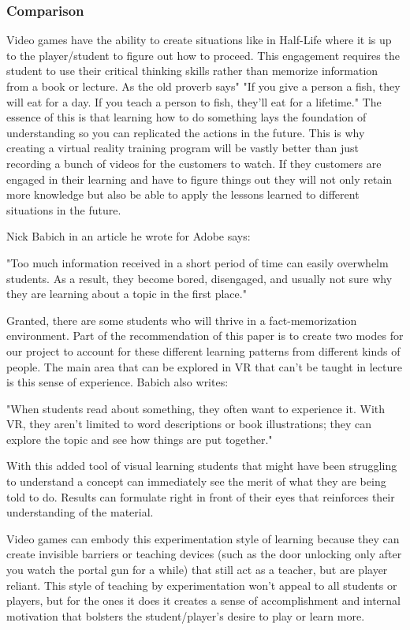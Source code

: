 \documentclass[onecolumn, draftclsnofoot,10pt, compsoc]{IEEEtran}
\begin{document}
\subsubsection{Comparison}
Video games have the ability to create situations like in Half-Life where it is up to the player/student to figure out how to proceed. This engagement requires the student to use their critical thinking skills rather than memorize information from a book or lecture. As the old proverb says" "If you give a person a fish, they will eat for a day. If you teach a person to fish, they'll eat for a lifetime." The essence of this is that learning how to do something lays the foundation of understanding so you can replicated the actions in the future. This is why creating a virtual reality training program will be vastly better than just recording a bunch of videos for the customers to watch. If they customers are engaged in their learning and have to figure things out they will not only retain more knowledge but also be able to apply the lessons learned to different situations in the future.

Nick Babich in an article he wrote for Adobe says:
\begin{displayquote}
"Too much information received in a short period of time can easily overwhelm students. As a result, they become bored, disengaged, and usually not sure why they are learning about a topic in the first place." \cite{adobe}
\end{displayquote}
Granted, there are some students who will thrive in a fact-memorization environment. Part of the recommendation of this paper is to create two modes for our project to account for these different learning patterns from different kinds of people. The main area that can be explored in VR that can't be taught in lecture is this sense of experience. Babich also writes:
\begin{displayquote}
"When students read about something, they often want to experience it. With VR, they aren't limited to word descriptions or book illustrations; they can explore the topic and see how things are put together." \cite{adobe}
\end{displayquote}
With this added tool of visual learning students that might have been struggling to understand a concept can immediately see the merit of what they are being told to do. Results can formulate right in front of their eyes that reinforces their understanding of the material.

Video games can embody this experimentation style of learning because they can create invisible barriers or teaching devices (such as the door unlocking only after you watch the portal gun for a while) that still act as a teacher, but are player reliant. This style of teaching by experimentation won't appeal to all students or players, but for the ones it does it creates a sense of accomplishment and internal motivation that bolsters the student/player's desire to play or learn more.
\end{document}
